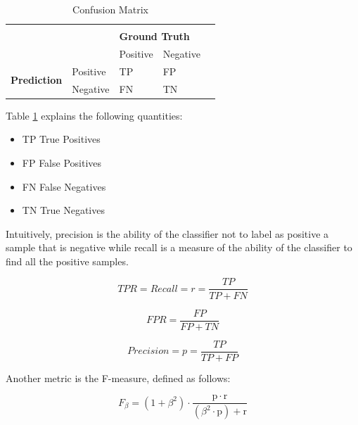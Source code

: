 \begin{table}[]
    \centering
    \begin{tabular}{lllll}
                                             &          &                                           &          & \\
        \multirow{2}{*}{}                    &          & \multicolumn{2}{l}{\textbf{Ground Truth}} &            \\
                                             &          & Positive                                  & Negative & \\
        \multirow{2}{*}{\textbf{Prediction}} & Positive & TP                                        & FP       & \\
                                             & Negative & FN                                        & TN       &
    \end{tabular}
    \caption{Confusion Matrix}
    \label{table:confusion_matrix}
\end{table}

Table \ref{table:confusion_matrix} explains the following quantities:

\begin{itemize}
    \item TP True Positives
    \item FP False Positives
    \item FN False Negatives
    \item TN True Negatives
\end{itemize}

Intuitively, precision is the ability of the classifier not to label as positive a sample that is negative while recall is a measure of the ability of the classifier to find all the positive samples. \cite{scikit-learn}


\begin{equation}
    TPR = Recall = r = \frac{TP}{TP+FN}
\end{equation}

\begin{equation}
    FPR = \frac{FP}{FP+TN}
\end{equation}

\begin{equation}
    Precision = p = \frac{TP}{TP+FP}
\end{equation}

Another metric is the F-measure, defined as follows:

\begin{equation}
    F_\beta = (1 + \beta^2) \cdot \frac{\mathrm{p} \cdot \mathrm{r}}{(\beta^2 \cdot \mathrm{p}) + \mathrm{r}}
\end{equation}

